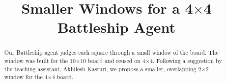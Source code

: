 \documentclass[conference,10pt]{IEEEtran}
\begin{document}
\title{Smaller Windows for a 4$\times$4 Battleship Agent}

\author{
}

\maketitle

\begin{abstract}
Our Battleship agent judges each square through a small window of the board.
The window was built for the 10$\times$10 board and reused on 4$\times$4.
Following a suggestion by the teaching assistant, Akhilesh Kasturi, we propose
a smaller, overlapping 2$\times$2 window for the 4$\times$4 board.
\end{abstract}
\end{document}

